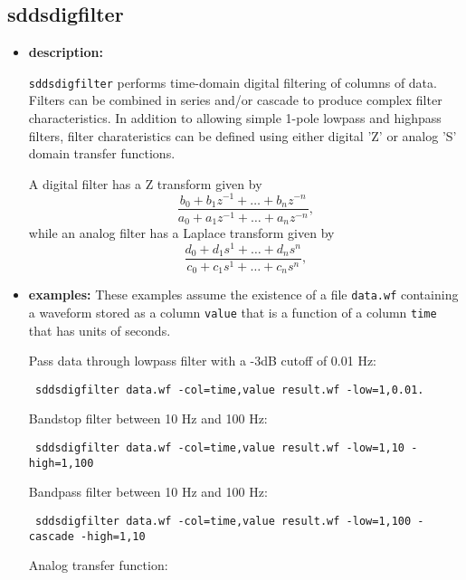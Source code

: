 \newpage

\subsection{sddsdigfilter}
\label{sddsdigfilter}

\begin{itemize}
\item {\bf description:}

{\tt sddsdigfilter} performs time-domain digital filtering of columns of data. Filters can
be combined in series and/or cascade to produce complex filter characteristics. In
addition to allowing simple 1-pole lowpass and highpass filters, filter charateristics can
be defined using either digital 'Z' or analog 'S' domain transfer functions.

A digital filter has a Z transform given by
\[
\frac{b_0 + b_1 z^{-1} + \ldots + b_n z^{-n}}{a_0 + a_1 z^{-1} + \ldots + a_n z^{-n}},
\]
while an analog filter has a Laplace transform given by
\[
\frac{d_0 + d_1 s^{1} + \ldots + d_n s^{n}}{c_0 + c_1 s^{1} + \ldots + c_n s^{n}},
\]

\item {\bf examples:} 
These examples assume the existence of a file {\tt data.wf} containing a waveform
stored as a column {\tt value} that is a function of a column {\tt time} that has
units of seconds.

 Pass data through lowpass filter with a -3dB cutoff of 0.01 Hz:

  \begin{flushleft}{\tt
  sddsdigfilter data.wf -col=time,value result.wf -low=1,0.01.
  }\end{flushleft}

  Bandstop filter between 10 Hz and 100 Hz:

  \begin{flushleft}{\tt
  sddsdigfilter data.wf -col=time,value result.wf -low=1,10 -high=1,100
  }\end{flushleft}

  Bandpass filter between 10 Hz and 100 Hz:

  \begin{flushleft}{\tt
  sddsdigfilter data.wf -col=time,value result.wf -low=1,100 -cascade -high=1,10
  }\end{flushleft}

  Analog transfer function:


\end{itemize}
